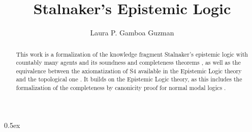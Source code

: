 \documentclass[11pt,a4paper]{article}
\begin{document}
\title{Stalnaker's Epistemic Logic}
\author{Laura P. Gamboa Guzman}
\maketitle

\begin{abstract}
  This work is a formalization of the knowledge fragment Stalnaker's epistemic logic with countably many agents and its soundness and completeness theorems \cite{Stalnaker2006, lectureNotesStalnaker, chagrov1997modal}, as well as the equivalence between the axiomatization of S4 available in the Epistemic Logic theory and the topological one \cite{Aiello2003}. It builds on the Epistemic Logic theory, as this includes the formalization of the completeness by canonicity proof for normal modal logics \cite{EpistemicLogicAFP, From2021}.
\end{abstract}

\tableofcontents

\parindent 0pt\parskip 0.5ex




\nocite{*}

\end{document}
